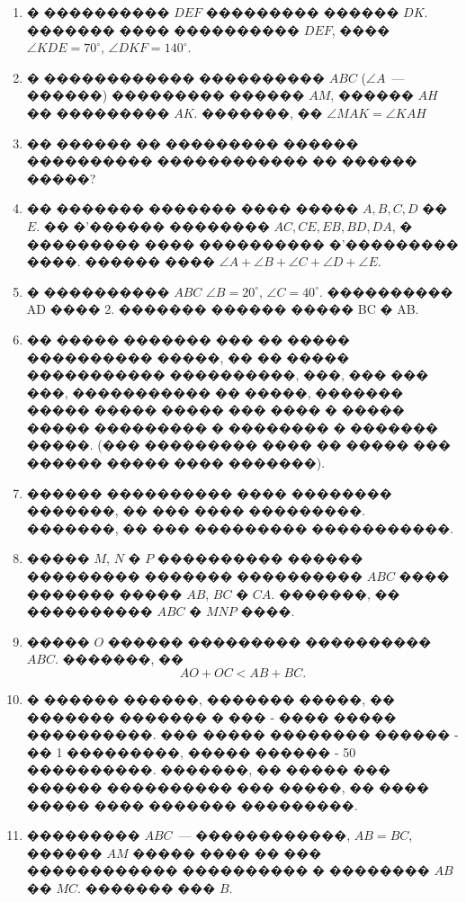 \documentclass[a4paper,12pt]{article}
\begin{document}
\begin{enumerate}
 \item � ���������� $DEF$ ��������� ������ $DK$. ������� ���� ���������� $DEF$, ���� $\angle KDE = 70^{\circ}$, $\angle DKF = 140^{\circ}$.

\item � ������������ ���������� $ABC$ ($\angle A$~--- ������) ��������� ������ $AM$, ������ $AH$ �� ��������� $AK$. �������, �� $\angle MAK=\angle KAH$

\item �� ������ �� ��������� ������ ���������� ������������ �� ������ �����?

\item �� ������� ������� ���� ����� $A,B,C,D$ �� $E$. �� �'������ �������� $AC, CE, EB, BD, DA$, � ��������� ���� ���������� �'��������� ����. ������ ���� $\angle A+\angle B+\angle C+\angle D+\angle E$.

\item � ���������� $ABC$ $\angle B = 20^{\circ}$, $\angle C = 40^{\circ}$. ���������� AD ���� 2. ������� ������ ����� BC � AB.

\item �� ����� ������� ��� �� ����� ���������� �����, �� �� ����� ����������� ����������, ���, ��� ��� ���, ����������� �� �����, ������� ����� ����� ����� ��� ���� � ����� ����� ��������� � �������� � ������� �����. (��� ��������� ���� �� ����� ��� ������ ����� ���� �������).

\item ������ ���������� ���� �������� �������, �� ��� ���� ���������. �������, �� ��� ��������� �����������.

\item ����� $M$, $N$ � $P$ ���������� ������ ��������� ������� ���������� $ABC$ ���� ������� ����� $AB$, $BC$ � $CA$. �������, �� ���������� $ABC$ � $MNP$ ����.

\item ����� $O$ ������ ��������� ���������� $ABC$. �������, �� $$AO+OC<AB+BC.$$

\item � ������ ������, ������� �����, �� ������� ������� � ��� - ���� ����� ����������. ��� ����� �������� ������ - �� 1 ���������, ����� ������ - 50 ����������. �������, �� ����� ��� ������ ���������� ��� �����, �� ���� ����� ���� ������� ���������.

\item ��������� $ABC$~--- ������������, $AB=BC$, ������ $AM$ ����� ���� �� ��� ������������ ���������� � �������� $AB$ �� $MC$. ������� ��� $B$.


\end{enumerate}
\end{document}
